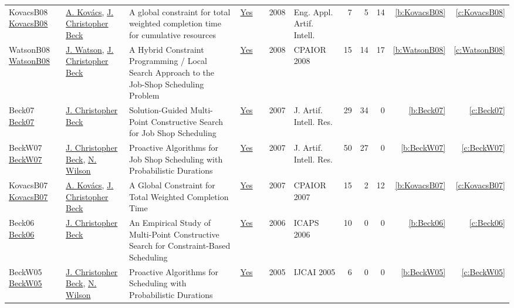 {\begin{longtable}{>{\raggedright\arraybackslash}p{3cm}>{\raggedright\arraybackslash}p{6cm}>{\raggedright\arraybackslash}p{6.5cm}rrrp{2.5cm}rrrrr}
KovacsB08 \href{https://doi.org/10.1016/j.engappai.2008.03.004}{KovacsB08} & \hyperref[auth:a147]{A. Kov{\'{a}}cs}, \hyperref[auth:a89]{J. Christopher Beck} & A global constraint for total weighted completion time for cumulative resources & \href{../works/KovacsB08.pdf}{Yes} & \cite{KovacsB08} & 2008 & Eng. Appl. Artif. Intell. & 7 & 5 & 14 & \ref{b:KovacsB08} & \ref{c:KovacsB08}\\
WatsonB08 \href{https://doi.org/10.1007/978-3-540-68155-7\_21}{WatsonB08} & \hyperref[auth:a366]{J. Watson}, \hyperref[auth:a89]{J. Christopher Beck} & A Hybrid Constraint Programming / Local Search Approach to the Job-Shop Scheduling Problem & \href{../works/WatsonB08.pdf}{Yes} & \cite{WatsonB08} & 2008 & CPAIOR 2008 & 15 & 14 & 17 & \ref{b:WatsonB08} & \ref{c:WatsonB08}\\
Beck07 \href{https://doi.org/10.1613/jair.2169}{Beck07} & \hyperref[auth:a89]{J. Christopher Beck} & Solution-Guided Multi-Point Constructive Search for Job Shop Scheduling & \href{../works/Beck07.pdf}{Yes} & \cite{Beck07} & 2007 & J. Artif. Intell. Res. & 29 & 34 & 0 & \ref{b:Beck07} & \ref{c:Beck07}\\
BeckW07 \href{https://doi.org/10.1613/jair.2080}{BeckW07} & \hyperref[auth:a89]{J. Christopher Beck}, \hyperref[auth:a838]{N. Wilson} & Proactive Algorithms for Job Shop Scheduling with Probabilistic Durations & \href{../works/BeckW07.pdf}{Yes} & \cite{BeckW07} & 2007 & J. Artif. Intell. Res. & 50 & 27 & 0 & \ref{b:BeckW07} & \ref{c:BeckW07}\\
KovacsB07 \href{https://doi.org/10.1007/978-3-540-72397-4\_9}{KovacsB07} & \hyperref[auth:a147]{A. Kov{\'{a}}cs}, \hyperref[auth:a89]{J. Christopher Beck} & A Global Constraint for Total Weighted Completion Time & \href{../works/KovacsB07.pdf}{Yes} & \cite{KovacsB07} & 2007 & CPAIOR 2007 & 15 & 2 & 12 & \ref{b:KovacsB07} & \ref{c:KovacsB07}\\
Beck06 \href{http://www.aaai.org/Library/ICAPS/2006/icaps06-028.php}{Beck06} & \hyperref[auth:a89]{J. Christopher Beck} & An Empirical Study of Multi-Point Constructive Search for Constraint-Based Scheduling & \href{../works/Beck06.pdf}{Yes} & \cite{Beck06} & 2006 & ICAPS 2006 & 10 & 0 & 0 & \ref{b:Beck06} & \ref{c:Beck06}\\
BeckW05 \href{http://ijcai.org/Proceedings/05/Papers/0748.pdf}{BeckW05} & \hyperref[auth:a89]{J. Christopher Beck}, \hyperref[auth:a838]{N. Wilson} & Proactive Algorithms for Scheduling with Probabilistic Durations & \href{../works/BeckW05.pdf}{Yes} & \cite{BeckW05} & 2005 & IJCAI 2005 & 6 & 0 & 0 & \ref{b:BeckW05} & \ref{c:BeckW05}\\

\end{longtable}}
